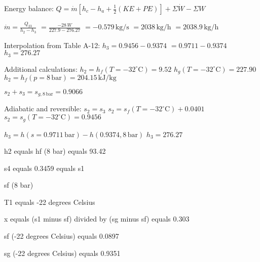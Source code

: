 Energy balance:  
\( Q = \dot{m} [h_c - h_a + \frac{1}{2} (KE + PE)] + \Sigma \dot{W} - \Sigma W \)  

\( \dot{m} = \frac{Q_{23}}{h_2 - h_3} \)  
\( = \frac{-28 \, W}{227.9 - 276.27} \)  
\( = -0.579 \, \text{kg/s} \)  
\( = 2038 \, \text{kg/h} \)  
\( = 2038.9 \, \text{kg/h} \)  

Interpolation from Table A-12:  
\( h_3 = 0.9456 - 0.9374 \)  
\( = 0.9711 - 0.9374 \)  
\( h_3 = 276.27 \)  

Additional calculations:  
\( h_2 = h_f (T = -32^\circ \text{C}) = 9.52 \)  
\( h_g (T = -32^\circ \text{C}) = 227.90 \)  
\( h_2 = h_f (p = 8 \, \text{bar}) = 204.15 \, \text{kJ/kg} \)  

\( s_2 + s_3 = s_{g, 8 \, \text{bar}} = 0.9066 \)  

Adiabatic and reversible: \( s_2 = s_3 \)  
\( s_2 = s_f (T = -32^\circ \text{C}) + 0.0401 \)  
\( s_2 = s_g (T = -32^\circ \text{C}) = 0.9456 \)  

\( h_3 = h (s = 0.9711 \, \text{bar}) - h (0.9374, 8 \, \text{bar}) \)  
\( h_3 = 276.27 \)

h2 equals hf (8 bar) equals 93.42  

s4 equals 0.3459 equals s1  

sf (8 bar)  

T1 equals -22 degrees Celsius  

x equals (s1 minus sf) divided by (sg minus sf) equals 0.303  

sf (-22 degrees Celsius) equals 0.0897  

sg (-22 degrees Celsius) equals 0.9351